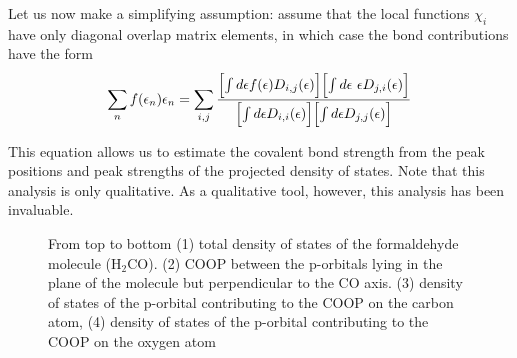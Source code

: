 \documentclass[final,12pt]{article}
\begin{document}
{{{{Let us now make a simplifying assumption: assume that the local
functions $\chi_i$ have only diagonal overlap matrix elements, in
which case the bond contributions have the form
\begin{displaymath}
\sum_n f(\epsilon_n)\epsilon_n =
\sum_{i,j}\frac{
\Bigl[\int d\epsilon f(\epsilon) D_{i,j}(\epsilon)\Bigr]
\Bigl[\int d\epsilon\ \epsilon  D_{j,i}(\epsilon)\Bigr]
}
{
\Bigl[\int d\epsilon D_{i,i}(\epsilon)\Bigr]
\Bigl[\int d\epsilon  D_{j,j}(\epsilon)\Bigr]
}
\end{displaymath}

This equation allows us to estimate the covalent bond strength from the
peak positions and peak strengths of the projected density of states.
Note that this analysis is only qualitative. As a qualitative tool,
however, this analysis has been invaluable.


\begin{figure}
\centerline{
}
 \caption{From top to bottom (1) total density of states of the 
   formaldehyde molecule (H$_2$CO). (2) COOP between the p-orbitals
   lying in the plane of the molecule but perpendicular to the CO
   axis. (3) density of states of the p-orbital contributing to the
   COOP on the carbon atom, (4) density of states of the p-orbital
   contributing to the COOP on the oxygen atom}
\label{fig:h2copdos}
\end{figure}

}}}}
\end{document}
